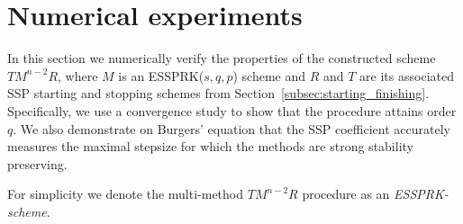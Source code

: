 \section{Numerical experiments}\label{sec:numerics}

In this section we numerically verify the properties of the
constructed scheme $TM^{n-2}R$, where $M$ is an ESSPRK($s,q,p$) scheme and
$R$ and $T$ are its associated SSP starting and stopping schemes from
Section~\ref{subsec:starting_finishing}.
Specifically, we use a convergence study to show that the procedure
attains order $q$.  We also demonstrate on Burgers' equation that the
SSP coefficient accurately measures the maximal stepsize for which the
methods are strong stability preserving.

For simplicity we denote the multi-method $TM^{n-2}R$ procedure as an
\emph{ESSPRK-scheme}.

